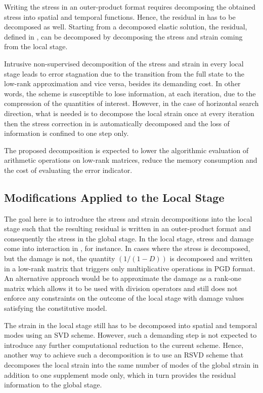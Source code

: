 Writing the stress in an outer-product format requires decomposing the obtained stress into spatial and temporal functions. Hence, the residual in  has to be decomposed as well. Starting from a decomposed elastic solution, the residual, defined in , can be decomposed by decomposing the stress and strain coming from the local stage.

Intrusive non-supervised decomposition of the stress and strain in every local stage leads to error stagnation due to the transition from the full state to the low-rank approximation and vice versa, besides its demanding cost. In other words, the scheme is susceptible to lose information, at each iteration, due to the compression of the quantities of interest. However, in the case of horizontal search direction, what is needed is to decompose the local strain once at every iteration then the stress correction in  is automatically decomposed and the loss of information is confined to one step only.

The proposed decomposition is expected to lower the algorithmic evaluation of arithmetic operations on low-rank matrices, reduce the memory consumption and the cost of evaluating the error indicator.

\subsection{Modifications Applied to the Local Stage}
The goal here is to introduce the stress and strain decompositions into the local stage such that the resulting residual is written in an outer-product format and consequently the stress in the global stage. In the local stage, stress and damage come into interaction in , for instance. In cases where the stress is decomposed, but the damage is not, the quantity $(1/(1-D))$ is decomposed and written in a low-rank matrix that triggers only multiplicative operations in PGD format. An alternative approach would be to approximate the damage as a rank-one matrix which allows it to be used with division operators and still does not enforce any constraints on the outcome of the local stage with damage values satisfying the constitutive model.

The strain in the local stage still has to be decomposed into spatial and temporal modes using an SVD scheme. However, such a demanding step is not expected to introduce any further computational reduction to the current scheme. Hence, another way to achieve such a decomposition is to use an RSVD scheme that decomposes the local strain into the same number of modes of the global strain in addition to one supplement mode only, which in turn provides the residual information to the global stage.

